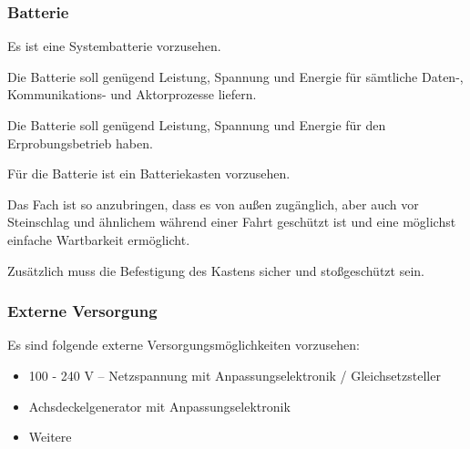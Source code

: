 \subsubsection{Batterie}
\begin{feat}
Es ist eine Systembatterie vorzusehen.
\end{feat}
\begin{rem}[zu Anf. 10]
Die Batterie soll genügend Leistung, Spannung und Energie für sämtliche Daten-, Kommunikations- und Aktorprozesse liefern.
\end{rem}
\begin{rem}[zu Anf. 10]
Die Batterie soll genügend Leistung, Spannung und Energie für den Erprobungsbetrieb haben.
\end{rem}
\begin{feat}
Für die Batterie ist ein Batteriekasten vorzusehen. 
\end{feat}
\begin{rem} [zu Anf. 11]
Das Fach ist so anzubringen, dass es von außen zugänglich, aber auch vor Steinschlag und ähnlichem während einer Fahrt geschützt ist und eine möglichst einfache Wartbarkeit ermöglicht.
\end{rem}
\begin{rem} [zu Anf. 11]
Zusätzlich muss die Befestigung des Kastens sicher und stoßgeschützt sein.
\end{rem}

\subsubsection{Externe Versorgung}
\begin{feat}
Es sind folgende externe Versorgungsmöglichkeiten vorzusehen:
\begin{itemize}
    \item 100 - 240 V -- Netzspannung mit Anpassungselektronik / Gleichsetzsteller
    \item Achsdeckelgenerator mit Anpassungselektronik
    \item Weitere
\end{itemize}
\end{feat}

